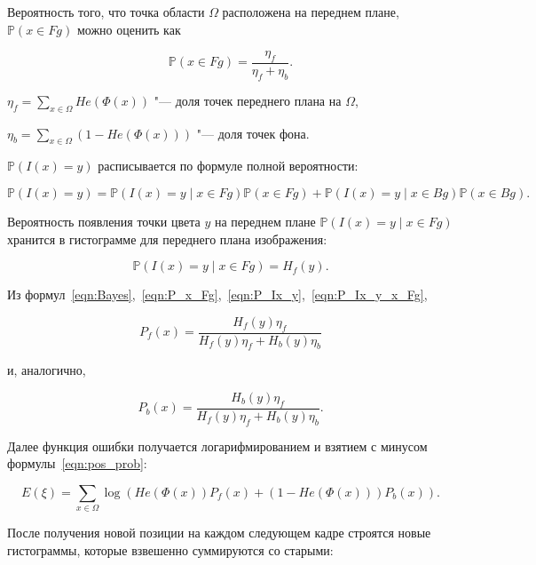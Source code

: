 Вероятность того, что точка области $\Omega$ расположена на переднем плане,
$\mathbb{P}(x \in Fg)$ можно оценить как

\begin{equation}
\label{eqn:P_x_Fg}
\mathbb{P}(x \in Fg) = \frac{\eta_f}{\eta_f + \eta_b}
\text{.}
\end{equation}

$
    \eta_f = \sum\limits_{x \in \Omega}He(\Phi(x))
$ "--- доля точек переднего плана на $\Omega$,

$
    \eta_b = \sum\limits_{x \in \Omega}(1 - He(\Phi(x)))
$ "--- доля точек фона.

$\mathbb{P}(I(x) = y)$ расписывается по формуле полной вероятности:

\begin{equation}
\label{eqn:P_Ix_y}
\mathbb{P}(I(x) = y) = \mathbb{P}(I(x) = y \mid x \in Fg) \mathbb{P}(x \in Fg)
+ \mathbb{P}(I(x) = y \mid x \in Bg) \mathbb{P}(x \in Bg)
\text{.}
\end{equation}

Вероятность появления точки цвета $y$ на переднем плане $\mathbb{P}(I(x) = y
\mid x \in Fg)$ хранится в гистограмме для переднего плана изображения:

\begin{equation}
\label{eqn:P_Ix_y_x_Fg}
\mathbb{P}(I(x) = y \mid x \in Fg) = H_f(y)
\text{.}
\end{equation}

Из
формул~\ref{eqn:Bayes},~\ref{eqn:P_x_Fg},~\ref{eqn:P_Ix_y},~\ref{eqn:P_Ix_y_x_Fg},

\begin{equation}
\label{eqn:P_x_Fg_y}
P_f(x)= \frac{H_f(y)\eta_f}{H_f(y)\eta_f + H_b(y)\eta_b}
\end{equation}

и, аналогично,

\begin{equation}
\label{eqn:P_x_Bg_y}
P_b(x) = \frac{H_b(y)\eta_f}{H_f(y)\eta_f + H_b(y)\eta_b}
\text{.}
\end{equation}

Далее функция ошибки получается логарифмированием и взятием с минусом
формулы~\ref{eqn:pos_prob}:

\begin{equation}
\label{err_func}
E(\xi) = \sum\limits_{x \in \Omega}
\log(He(\Phi(x))P_f(x) + (1 - He(\Phi(x)))P_b(x))
\text{.}
\end{equation}

После получения новой позиции на каждом следующем кадре строятся новые
гистограммы, которые взвешенно суммируются со старыми: 

